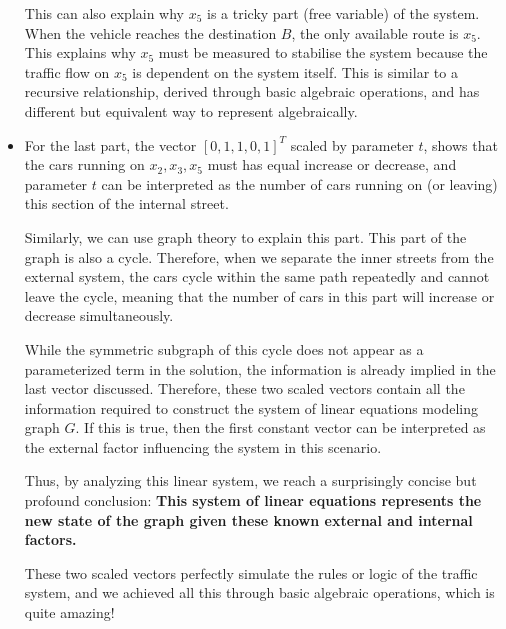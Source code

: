 \documentclass[12pt,a4paper]{article}
\begin{document}
\begin{solution}
\begin{itemize}
\begin{remark}
        This can also explain why $x_5$ is a tricky part (free variable) of the system. When the vehicle reaches the destination $B$, the only available route is $x_5$. This explains why $x_5$ must be measured to stabilise the system because the traffic flow on $x_5$ is dependent on the system itself. This is similar to a recursive relationship, derived through basic algebraic operations, and has different but equivalent way to represent algebraically.
    
    \end{remark}
    \item For the last part, the vector $[0,1,1,0,1]^T$ scaled by parameter $t$, shows that the cars running on $x_2,x_3,x_5$ must has equal increase or decrease, and parameter $t$ can be interpreted as the number of cars running on (or leaving) this section of the internal street.
  \begin{remark}
        Similarly, we can use graph theory to explain this part. This part of the graph is also a cycle. Therefore, when we separate the inner streets from the external system, the cars cycle within the same path repeatedly and cannot leave the cycle, meaning that the number of cars in this part will increase or decrease simultaneously.
        \begin{note}
            While the symmetric subgraph of this cycle does not appear as a parameterized term in the solution, the information is already implied in the last vector discussed. Therefore, these two scaled vectors contain all the information required to construct the system of linear equations modeling graph $G$. If this is true, then the first constant vector can be interpreted as the external factor influencing the system in this scenario.

            Thus, by analyzing this linear system, we reach a surprisingly concise but profound conclusion: \textbf{This system of linear equations represents the new state of the graph given these known external and internal factors.}

            These two scaled vectors perfectly simulate the rules or logic of the traffic system, and we achieved all this through basic algebraic operations, which is quite amazing!
        \end{note}
    \end{remark}
\end{itemize}
\end{solution}
\end{document}
